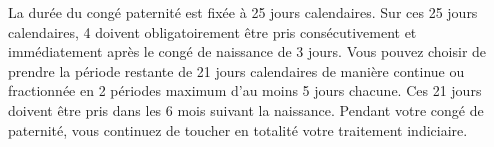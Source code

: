 La dur\'ee du cong\'e paternit\'e est fix\'ee à 25 jours calendaires. Sur ces 25 jours calendaires, 4 doivent obligatoirement \^etre pris cons\'ecutivement et imm\'ediatement apr\`es le cong\'e de naissance de 3 jours. 
Vous pouvez choisir de prendre la p\'eriode restante de 21 jours calendaires de mani\`ere continue ou fractionn\'ee en 2 p\'eriodes maximum d'au moins 5 jours chacune.
Ces 21 jours doivent \^etre pris dans les 6 mois suivant la naissance.
Pendant votre cong\'e de paternit\'e, vous continuez de toucher en totalit\'e votre traitement indiciaire.

